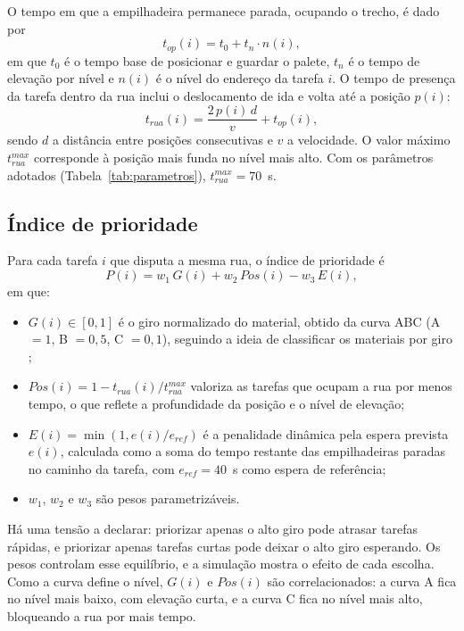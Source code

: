 \documentclass[
	article,
	11pt,
	oneside,
	a4paper,
	english,
	brazil,
	sumario=tradicional
	]{abntex2}
\begin{document}
O tempo em que a empilhadeira permanece parada, ocupando o trecho, é dado por
\begin{equation}
	t_{op}(i) = t_0 + t_n \cdot n(i),
\end{equation}
em que $t_0$ é o tempo base de posicionar e guardar o palete, $t_n$ é o tempo
de elevação por nível e $n(i)$ é o nível do endereço da tarefa $i$. O tempo de
presença da tarefa dentro da rua inclui o deslocamento de ida e volta até a
posição $p(i)$:
\begin{equation}
	t_{rua}(i) = \frac{2 \, p(i) \, d}{v} + t_{op}(i),
\end{equation}
sendo $d$ a distância entre posições consecutivas e $v$ a velocidade. O valor
máximo $t_{rua}^{max}$ corresponde à posição mais funda no nível mais alto. Com
os parâmetros adotados (Tabela~\ref{tab:parametros}), $t_{rua}^{max} = 70$~s.

\subsection{Índice de prioridade}

Para cada tarefa $i$ que disputa a mesma rua, o índice de prioridade é
\begin{equation}
	P(i) = w_1 \, G(i) + w_2 \, Pos(i) - w_3 \, E(i),
\end{equation}
em que:
\begin{itemize}
	\item $G(i) \in [0,1]$ é o giro normalizado do material, obtido da curva
	ABC (A $=1$, B $=0{,}5$, C $=0{,}1$), seguindo a ideia de classificar os
	materiais por giro \cite{hausman1976};
	\item $Pos(i) = 1 - t_{rua}(i)/t_{rua}^{max}$ valoriza as tarefas que
	ocupam a rua por menos tempo, o que reflete a profundidade da posição e o
	nível de elevação;
	\item $E(i) = \min(1, e(i)/e_{ref})$ é a penalidade dinâmica pela espera
	prevista $e(i)$, calculada como a soma do tempo restante das empilhadeiras
	paradas no caminho da tarefa, com $e_{ref} = 40$~s como espera de
	referência;
	\item $w_1$, $w_2$ e $w_3$ são pesos parametrizáveis.
\end{itemize}

Há uma tensão a declarar: priorizar apenas o alto giro pode atrasar tarefas
rápidas, e priorizar apenas tarefas curtas pode deixar o alto giro esperando.
Os pesos controlam esse equilíbrio, e a simulação mostra o efeito de cada
escolha. Como a curva define o nível, $G(i)$ e $Pos(i)$ são correlacionados:
a curva A fica no nível mais baixo, com elevação curta, e a curva C fica no
nível mais alto, bloqueando a rua por mais tempo.
\end{document}
